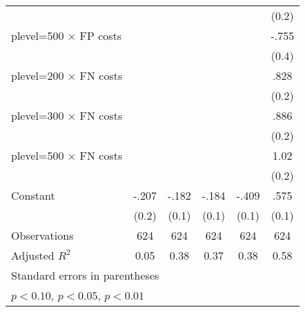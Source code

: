 \begin{table}[htbp]
\begin{tabular}{l*{5}{c}}
                &                  &                  &                  &                  &    (0.2)         \\
plevel=500 $\times$ FP costs&                  &                  &                  &                  &    -.755\sym{*}  \\
                &                  &                  &                  &                  &    (0.4)         \\
plevel=200 $\times$ FN costs&                  &                  &                  &                  &     .828\sym{***}\\
                &                  &                  &                  &                  &    (0.2)         \\
plevel=300 $\times$ FN costs&                  &                  &                  &                  &     .886\sym{***}\\
                &                  &                  &                  &                  &    (0.2)         \\
plevel=500 $\times$ FN costs&                  &                  &                  &                  &     1.02\sym{***}\\
                &                  &                  &                  &                  &    (0.2)         \\
Constant        &    -.207         &    -.182\sym{**} &    -.184\sym{**} &    -.409\sym{***}&     .575\sym{***}\\
                &    (0.2)         &    (0.1)         &    (0.1)         &    (0.1)         &    (0.1)         \\
\hline
Observations    &      624         &      624         &      624         &      624         &      624         \\
Adjusted \(R^{2}\)&     0.05         &     0.38         &     0.37         &     0.38         &     0.58         \\
\hline\hline
\multicolumn{6}{l}{\footnotesize Standard errors in parentheses}\\
\multicolumn{6}{l}{\footnotesize \sym{*} \(p<0.10\), \sym{**} \(p<0.05\), \sym{***} \(p<0.01\)}\\
\end{tabular}
\end{table}
